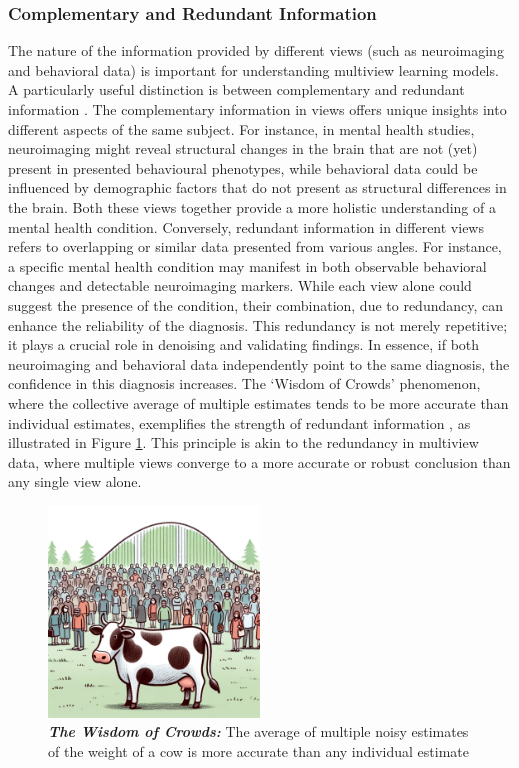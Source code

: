 \subsubsection{Complementary and Redundant Information}
The nature of the information provided by different \gls{views} (such as neuroimaging and behavioral data) is important for understanding multiview learning models.
A particularly useful distinction is between complementary and redundant information \citep{nguyen2020multiview,lyu2021understanding, chen2022representation}.
The complementary information in views offers unique insights into different aspects of the same subject. For instance, in mental health studies, neuroimaging might reveal structural changes in the brain that are not (yet) present in presented behavioural phenotypes, while behavioral data could be influenced by demographic factors that do not present as structural differences in the brain. Both these views together provide a more holistic understanding of a mental health condition.
Conversely, redundant information in different views refers to overlapping or similar data presented from various angles. For instance, a specific mental health condition may manifest in both observable behavioral changes and detectable neuroimaging markers. While each view alone could suggest the presence of the condition, their combination, due to redundancy, can enhance the reliability of the diagnosis. This redundancy is not merely repetitive; it plays a crucial role in denoising and validating findings. In essence, if both neuroimaging and behavioral data independently point to the same diagnosis, the confidence in this diagnosis increases.
The `Wisdom of Crowds' phenomenon, where the collective average of multiple estimates tends to be more accurate than individual estimates, exemplifies the strength of redundant information \citep{galton1907vox}, as illustrated in Figure \ref{fig:wisdomofcrowds}. This principle is akin to the redundancy in multiview data, where multiple views converge to a more accurate or robust conclusion than any single view alone.

\begin{figure}
    \centering
    \includegraphics[width=0.5\textwidth]{figures/cow.png}
    \caption[The Wisdom of Crowds]{\textit{\textbf{The Wisdom of Crowds:}} The average of multiple noisy estimates of the weight of a cow is more accurate than any individual estimate}\label{fig:wisdomofcrowds}
\end{figure}

